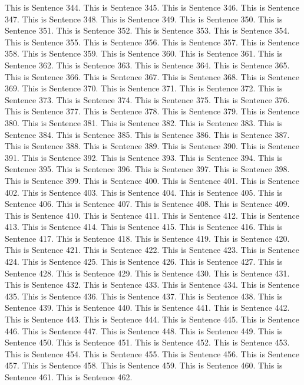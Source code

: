 \documentclass{article}
\begin{document}
This is Sentence 344.
This is Sentence 345.
This is Sentence 346.
This is Sentence 347.
This is Sentence 348.
This is Sentence 349.
This is Sentence 350.
This is Sentence 351.
This is Sentence 352.
This is Sentence 353.
This is Sentence 354.
This is Sentence 355.
This is Sentence 356.
This is Sentence 357.
This is Sentence 358.
This is Sentence 359.
This is Sentence 360.
This is Sentence 361.
This is Sentence 362.
This is Sentence 363.
This is Sentence 364.
This is Sentence 365.
This is Sentence 366.
This is Sentence 367.
This is Sentence 368.
This is Sentence 369.
This is Sentence 370.
This is Sentence 371.
This is Sentence 372.
This is Sentence 373.
This is Sentence 374.
This is Sentence 375.
This is Sentence 376.
This is Sentence 377.
This is Sentence 378.
This is Sentence 379.
This is Sentence 380.
This is Sentence 381.
This is Sentence 382.
This is Sentence 383.
This is Sentence 384.
This is Sentence 385.
This is Sentence 386.
This is Sentence 387.
This is Sentence 388.
This is Sentence 389.
This is Sentence 390.
This is Sentence 391.
This is Sentence 392.
This is Sentence 393.
This is Sentence 394.
This is Sentence 395.
This is Sentence 396.
This is Sentence 397.
This is Sentence 398.
This is Sentence 399.
This is Sentence 400.
This is Sentence 401.
This is Sentence 402.
This is Sentence 403.
This is Sentence 404.
This is Sentence 405.
This is Sentence 406.
This is Sentence 407.
This is Sentence 408.
This is Sentence 409.
This is Sentence 410.
This is Sentence 411.
This is Sentence 412.
This is Sentence 413.
This is Sentence 414.
This is Sentence 415.
This is Sentence 416.
This is Sentence 417.
This is Sentence 418.
This is Sentence 419.
This is Sentence 420.
This is Sentence 421.
This is Sentence 422.
This is Sentence 423.
This is Sentence 424.
This is Sentence 425.
This is Sentence 426.
This is Sentence 427.
This is Sentence 428.
This is Sentence 429.
This is Sentence 430.
This is Sentence 431.
This is Sentence 432.
This is Sentence 433.
This is Sentence 434.
This is Sentence 435.
This is Sentence 436.
This is Sentence 437.
This is Sentence 438.
This is Sentence 439.
This is Sentence 440.
This is Sentence 441.
This is Sentence 442.
This is Sentence 443.
This is Sentence 444.
This is Sentence 445.
This is Sentence 446.
This is Sentence 447.
This is Sentence 448.
This is Sentence 449.
This is Sentence 450.
This is Sentence 451.
This is Sentence 452.
This is Sentence 453.
This is Sentence 454.
This is Sentence 455.
This is Sentence 456.
This is Sentence 457.
This is Sentence 458.
This is Sentence 459.
This is Sentence 460.
This is Sentence 461.
This is Sentence 462.
\end{document}
